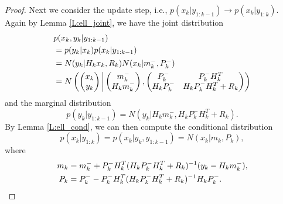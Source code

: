 \begin{proof}
Next we consider the update step, i.e., 
$p(x_k|y_{1:k-1}) \to p(x_k|y_{1:k})$.
Again by Lemma \ref{L:ell_joint}, we have the joint distribution
\begin{align}
  & p(x_k,y_k|y_{1:k-1}) \notag \\
  &= p(y_k|x_k) p(x_k | y_{1:k-1}) \notag \\
  &= N(y_k | H_k x_k, R_k) N(x_k | m_k^-, P_k^-) \notag \\
  &= N\left(
	  \begin{pmatrix}
	    x_k \\
	    y_k \\
	  \end{pmatrix} \bigg\rvert
	  \begin{pmatrix}
	    m_k^-      \\
		H_k m_k^-  \\
	  \end{pmatrix},
	  \begin{pmatrix}
	    P_k^-      &  P_k^- H_k^T            \\
		H_k P_k^-  &  H_k P_k^- H_k^T + R_k  \\
	  \end{pmatrix} 
	\right)
\end{align}
and the marginal distribution
\begin{equation}
  p(y_k|y_{1:k-1}) = N(y_k| H_k m_k^-, H_k P_k^- H_k^T + R_k ).
\end{equation}
By Lemma \ref{L:ell_cond}, we can then compute the conditional distribution 
\begin{equation}
  p(x_k|y_{1:k}) = p(x_k | y_k, y_{1:k-1}) = N(x_k| m_k, P_k),
\end{equation}
where
\begin{align}
  m_k &= m_k^- + P_k^- H_k^T (H_k P_k^- H_k^T + R_k)^{-1} (y_k-H_km_k^-), \notag \\
  P_k &= P_k^- - P_k^- H_k^T (H_k P_k^- H_k^T + R_k)^{-1} H_k P_k^-. 
\end{align}

\end{proof}
